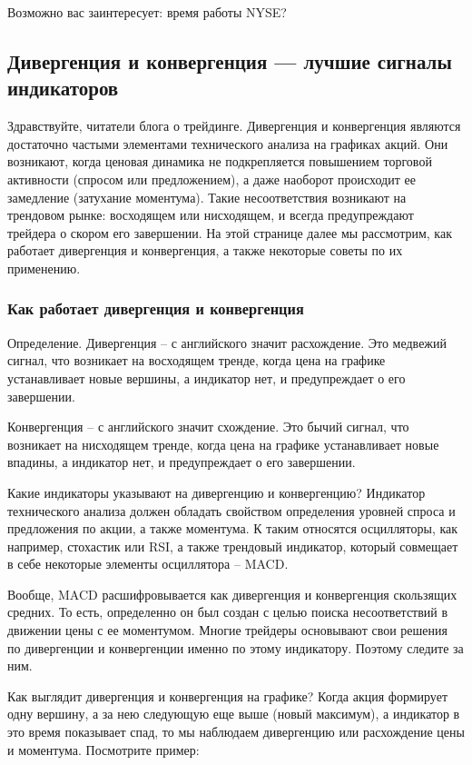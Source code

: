 \documentclass[a5paper]{article}
\begin{document}
Возможно вас заинтересует: время работы NYSE?

\subsection{Дивергенция и конвергенция — лучшие сигналы индикаторов}

Здравствуйте, читатели блога о трейдинге. Дивергенция и конвергенция являются достаточно частыми элементами технического анализа на графиках акций. Они  возникают, когда ценовая динамика не подкрепляется повышением торговой активности (спросом или предложением), а даже наоборот происходит ее замедление (затухание моментума). Такие несоответствия возникают на трендовом рынке: восходящем или нисходящем, и всегда предупреждают трейдера о скором его завершении. На этой странице далее мы рассмотрим, как работает дивергенция и конвергенция, а также некоторые советы по их применению.

\subsubsection{Как работает дивергенция и конвергенция}

Определение. Дивергенция – с английского значит расхождение. Это медвежий сигнал, что возникает на восходящем тренде, когда цена на графике устанавливает новые вершины, а индикатор нет, и предупреждает о его завершении.

Конвергенция – с английского значит схождение. Это бычий сигнал, что возникает на нисходящем тренде, когда цена на графике устанавливает новые впадины, а индикатор нет, и предупреждает о его завершении.

Какие индикаторы указывают на дивергенцию и конвергенцию? Индикатор технического анализа должен обладать свойством определения уровней спроса и предложения по акции, а также моментума. К таким относятся осцилляторы, как например, стохастик или RSI, а также трендовый индикатор, который совмещает в себе некоторые элементы осциллятора – MACD.

Вообще, MACD расшифровывается как дивергенция и конвергенция скользящих средних. То есть, определенно он был создан с целью поиска несоответствий в движении цены с ее моментумом. Многие трейдеры основывают свои решения по дивергенции и конвергенции именно по этому индикатору. Поэтому следите за ним.

Как выглядит дивергенция и конвергенция на графике? Когда акция
формирует одну вершину, а за нею следующую еще выше (новый максимум),
а индикатор в это время показывает спад, то мы наблюдаем дивергенцию
или расхождение цены и моментума. Посмотрите пример:
\end{document}
